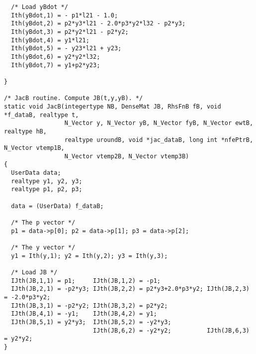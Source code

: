 \begin{verbatim}
  /* Load yBdot */
  Ith(yBdot,1) = - p1*l21 - 1.0;
  Ith(yBdot,2) = p2*y3*l21 - 2.0*p3*y2*l32 - p2*y3;
  Ith(yBdot,3) = p2*y2*l21 - p2*y2;
  Ith(yBdot,4) = y1*l21;
  Ith(yBdot,5) = - y23*l21 + y23;
  Ith(yBdot,6) = y2*y2*l32;
  Ith(yBdot,7) = y1+p2*y23;

}

/* JacB routine. Compute JB(t,y,yB). */
static void JacB(integertype NB, DenseMat JB, RhsFnB fB, void *f_dataB, realtype t,
                 N_Vector y, N_Vector yB, N_Vector fyB, N_Vector ewtB, realtype hB, 
                 realtype uroundB, void *jac_dataB, long int *nfePtrB, N_Vector vtemp1B,
                 N_Vector vtemp2B, N_Vector vtemp3B)
{
  UserData data;
  realtype y1, y2, y3;
  realtype p1, p2, p3;
  
  data = (UserData) f_dataB;

  /* The p vector */
  p1 = data->p[0]; p2 = data->p[1]; p3 = data->p[2];

  /* The y vector */
  y1 = Ith(y,1); y2 = Ith(y,2); y3 = Ith(y,3);

  /* Load JB */
  IJth(JB,1,1) = p1;     IJth(JB,1,2) = -p1; 
  IJth(JB,2,1) = -p2*y3; IJth(JB,2,2) = p2*y3+2.0*p3*y2; IJth(JB,2,3) = -2.0*p3*y2;
  IJth(JB,3,1) = -p2*y2; IJth(JB,3,2) = p2*y2;
  IJth(JB,4,1) = -y1;    IJth(JB,4,2) = y1; 
  IJth(JB,5,1) = y2*y3;  IJth(JB,5,2) = -y2*y3; 
                         IJth(JB,6,2) = -y2*y2;          IJth(JB,6,3) = y2*y2; 
}
\end{verbatim}
